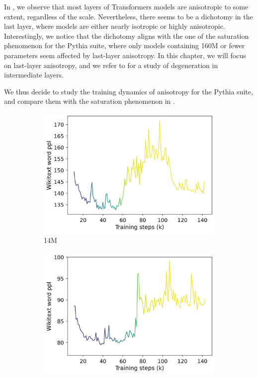 In , we observe that most layers of Transformers models are anisotropic to some extent, regardless of the scale. Nevertheless, there seems to be a dichotomy in the last layer, where models are either nearly isotropic or highly anisotropic. Interestingly, we notice that the dichotomy aligns with the one of the saturation phenomenon for the Pythia suite, where only models containing 160M or fewer parameters seem affected by last-layer anisotropy. In this chapter, we will focus on last-layer anisotropy, and we refer to  for a study of degeneration in intermediate layers.

We thus decide to study the training dynamics of anisotropy for the Pythia suite, and compare them with the saturation phenomenon in .

\begin{figure}[ht!]
    \centering
    \begin{subfigure}{0.45\columnwidth}
         \includegraphics[width=\linewidth]{sources/part_1/softmax_bottleneck/imgs/anisotropy_explosion_14m.png}
         \caption{14M}
         \label{fig:14M}
    \end{subfigure}
    \begin{subfigure}{0.45\columnwidth}
         \includegraphics[width=\linewidth]{sources/part_1/softmax_bottleneck/imgs/anisotropy_explosion_31m.png}

\end{subfigure}
\end{figure}

